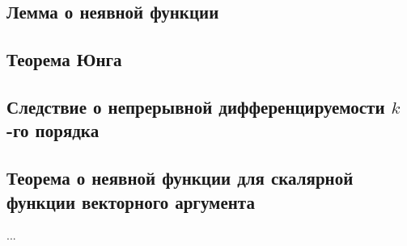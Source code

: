 \subsection{Лемма о неявной функции}
\subsection{Теорема Юнга}
\subsection{Следствие о непрерывной дифференцируемости $k$-го порядка}
\subsection{Теорема о неявной функции для скалярной функции векторного аргумента}
...

